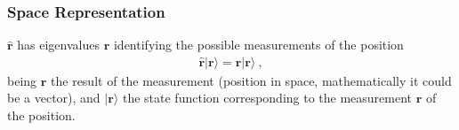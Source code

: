 \documentclass[letterpaper,10pt,english]{jupyterBook}
\begin{document}
\subsubsection{Space Representation}
\label{\detokenize{ch/quantum-mechanics/intro:space-representation}}
\sphinxAtStartPar
{} \(\hat{\mathbf{r}}\) has eigenvalues \(\mathbf{r}\) identifying the possible measurements of the position
\begin{equation*}
\begin{split}\hat{\mathbf{r}} | \mathbf{r} \rangle = \mathbf{r} | \mathbf{r} \rangle \ ,\end{split}
\end{equation*}
\sphinxAtStartPar
being \(\mathbf{r}\) the result of the measurement (position in space, mathematically it could be a vector), and \(| \mathbf{r} \rangle\) the state function corresponding to the measurement \(\mathbf{r}\) of the position.
\end{document}
